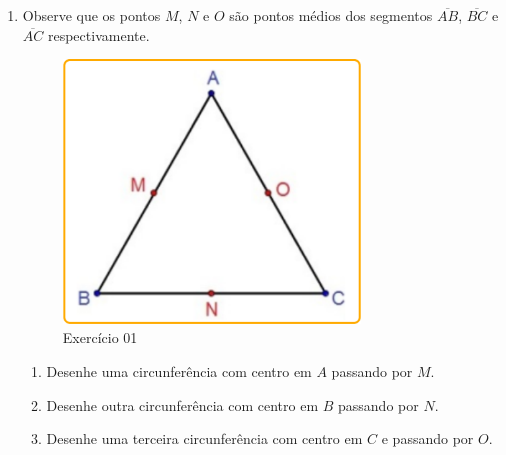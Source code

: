 \documentclass[11pt,a4paper]{article}
\begin{document}
\begin{enumerate}[{Exercício} 1.]
\item Observe que os pontos $M$, $N$ e $O$ são pontos médios dos segmentos $\overline{AB}$, $\overline{BC}$ e $\overline{AC}$ respectivamente.
\begin{figure}[H]
    \centering
    \includegraphics[height=7cm]{Figuras/T01_Exercicio01.png}
    \caption{Exercício 01}
\end{figure}
    \begin{enumerate}
        \item Desenhe uma circunferência com centro em $A$ passando por $M$.
        \item Desenhe outra circunferência com centro em $B$ passando por $N$.
        \item Desenhe uma terceira circunferência com centro em $C$ e passando por $O$.
    \end{enumerate}


\end{enumerate}
\end{document}
